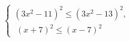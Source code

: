 \begin{ex}[type=ineq_system]
	\begin{condition}
		$\begin{cases}(3x^2 - 11)^2\leqslant(3x^2 - 13)^2 ,\\
			\; (x + 7)^2\leqslant(x - 7)^2 
		\end{cases}$
	\end{condition}
	\answer{$ [-2;0] ; $}
\end{ex}